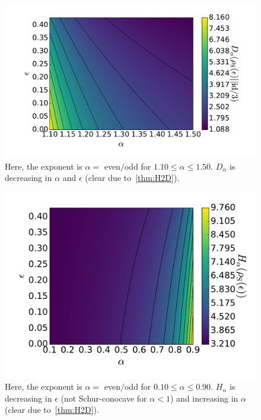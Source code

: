 \documentclass[pra,
aps,
twocolumn,
superscriptaddress,
groupedaddress,
nofootinbib,
reprint
]{revtex4-1}
\begin{document}
\begin{figure}[h]
    \centering
    \includegraphics[scale=0.35]{figs/test/D_vs_eps_a.pdf}
    \caption{Here, the exponent is $\alpha =$ even$/$odd for $1.10 \leq \alpha \leq 1.50$. $D_\alpha$ is decreasing in $\alpha$ and $\epsilon$ (clear due to~\cref{thm:H2D}).
    }
    \label{fig:D}
\end{figure}

\begin{figure}[h]
    \centering
    \includegraphics[scale=0.35]{figs/test/H_test.pdf}
    \caption{Here, the exponent is $\alpha =$ even$/$odd for $0.10 \leq \alpha \leq 0.90$. $H_\alpha$ is decreasing in $\epsilon$ (not Schur-conocave for $\alpha < 1$) and increasing in $\alpha$ (clear due to~\cref{thm:H2D}).
    }
    \label{fig:Htest}
\end{figure}
\end{document}
